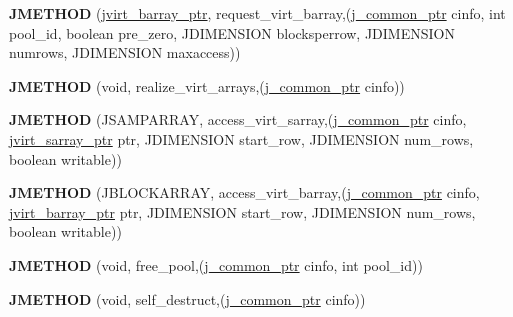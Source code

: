 \begin{DoxyCompactItemize}
\item 
\hypertarget{structjpeg__memory__mgr_aee93326ad6a64714443e90044614d2a6}{{\bfseries J\+M\+E\+T\+H\+O\+D} (\hyperlink{structjvirt__barray__control}{jvirt\+\_\+barray\+\_\+ptr}, request\+\_\+virt\+\_\+barray,(\hyperlink{structjpeg__common__struct}{j\+\_\+common\+\_\+ptr} cinfo, int pool\+\_\+id, boolean pre\+\_\+zero, J\+D\+I\+M\+E\+N\+S\+I\+O\+N blocksperrow, J\+D\+I\+M\+E\+N\+S\+I\+O\+N numrows, J\+D\+I\+M\+E\+N\+S\+I\+O\+N maxaccess))}\label{structjpeg__memory__mgr_aee93326ad6a64714443e90044614d2a6}

\item 
\hypertarget{structjpeg__memory__mgr_a35cc0c3b3ecbc7209cdc23b2255932d8}{{\bfseries J\+M\+E\+T\+H\+O\+D} (void, realize\+\_\+virt\+\_\+arrays,(\hyperlink{structjpeg__common__struct}{j\+\_\+common\+\_\+ptr} cinfo))}\label{structjpeg__memory__mgr_a35cc0c3b3ecbc7209cdc23b2255932d8}

\item 
\hypertarget{structjpeg__memory__mgr_a747ad4316a4794b13f9fdff4f6f699ca}{{\bfseries J\+M\+E\+T\+H\+O\+D} (J\+S\+A\+M\+P\+A\+R\+R\+A\+Y, access\+\_\+virt\+\_\+sarray,(\hyperlink{structjpeg__common__struct}{j\+\_\+common\+\_\+ptr} cinfo, \hyperlink{structjvirt__sarray__control}{jvirt\+\_\+sarray\+\_\+ptr} ptr, J\+D\+I\+M\+E\+N\+S\+I\+O\+N start\+\_\+row, J\+D\+I\+M\+E\+N\+S\+I\+O\+N num\+\_\+rows, boolean writable))}\label{structjpeg__memory__mgr_a747ad4316a4794b13f9fdff4f6f699ca}

\item 
\hypertarget{structjpeg__memory__mgr_aa460f4b500825e051306b8ce5583d052}{{\bfseries J\+M\+E\+T\+H\+O\+D} (J\+B\+L\+O\+C\+K\+A\+R\+R\+A\+Y, access\+\_\+virt\+\_\+barray,(\hyperlink{structjpeg__common__struct}{j\+\_\+common\+\_\+ptr} cinfo, \hyperlink{structjvirt__barray__control}{jvirt\+\_\+barray\+\_\+ptr} ptr, J\+D\+I\+M\+E\+N\+S\+I\+O\+N start\+\_\+row, J\+D\+I\+M\+E\+N\+S\+I\+O\+N num\+\_\+rows, boolean writable))}\label{structjpeg__memory__mgr_aa460f4b500825e051306b8ce5583d052}

\item 
\hypertarget{structjpeg__memory__mgr_a7e7e063767441999982d22c5cc0e9423}{{\bfseries J\+M\+E\+T\+H\+O\+D} (void, free\+\_\+pool,(\hyperlink{structjpeg__common__struct}{j\+\_\+common\+\_\+ptr} cinfo, int pool\+\_\+id))}\label{structjpeg__memory__mgr_a7e7e063767441999982d22c5cc0e9423}

\item 
\hypertarget{structjpeg__memory__mgr_ae80ddea0ba4f845f91d3a30e350b5f44}{{\bfseries J\+M\+E\+T\+H\+O\+D} (void, self\+\_\+destruct,(\hyperlink{structjpeg__common__struct}{j\+\_\+common\+\_\+ptr} cinfo))}\label{structjpeg__memory__mgr_ae80ddea0ba4f845f91d3a30e350b5f44}

\end{DoxyCompactItemize}
